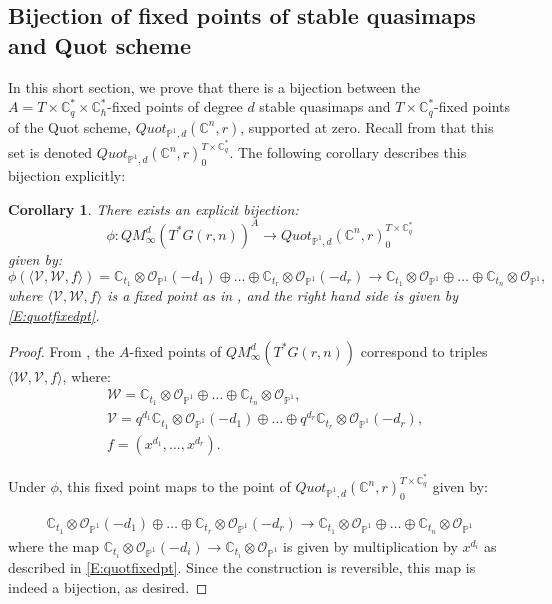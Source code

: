 \documentclass{amsart}
\newtheorem{Corollary}[thm]{Corollary}
\begin{document}
\subsection{Bijection of fixed points of stable quasimaps and Quot scheme}
In this short section, we prove that there is a bijection between the $A=T \times \mathbb{C}^*_q \times \mathbb{C}^*_\hbar$-fixed points of degree $d$ stable quasimaps and $T \times \mathbb{C}_q^*$-fixed points of the Quot scheme, $Quot_{\mathbb{P}^1,d}(\mathbb{C}^n,r)$, supported at zero. Recall from  that this set is denoted $Quot_{\mathbb{P}^1,d}(\mathbb{C}^n,r)_{0}^{T \times \mathbb{C}_q^*}$. The following corollary describes this bijection explicitly:
\begin{Corollary}
    There exists an explicit bijection: 
\[\phi: QM_{\infty}^d(T^*G(r,n))^{A} \to Quot_{\mathbb{P}^1,d}(\mathbb{C}^n,r)_0^{T \times \mathbb{C}_q^*}
\]
given by:
\[
\phi(\langle \mathcal{V},\mathcal{W},f\rangle) = \mathbb{C}_{t_1}\otimes\mathcal{O}_{\mathbb{P}^1}(-d_1) \oplus \dots \oplus \mathbb{C}_{t_r}\otimes\mathcal{O}_{\mathbb{P}^1}(-d_r) \to \mathbb{C}_{t_1}\otimes\mathcal{O}_{\mathbb{P}^1} \oplus \dots \oplus \mathbb{C}_{t_n}\otimes\mathcal{O}_{\mathbb{P}^1},
\]
where $\langle \mathcal{V},\mathcal{W},f\rangle$ is a fixed point as in , and the right hand side is given by \eqref{E:quotfixedpt}.

\end{Corollary}
\begin{proof}
From , the $A$-fixed points of $QM_{\infty}^d(T^*G(r,n))$ correspond to triples $\langle\mathcal{W},\mathcal{V},f\rangle$, where:
    \begin{align*}
    &\mathcal{W} = \mathbb{C}_{t_1}\otimes\mathcal{O}_{\mathbb{P}^1} \oplus\dots\oplus \mathbb{C}_{t_n}\otimes\mathcal{O}_{\mathbb{P}^1},\\&
    \mathcal{V} = q^{d_1}\mathbb{C}_{t_1}\otimes\mathcal{O}_{\mathbb{P}^1}(-d_1) \oplus \dots \oplus q^{d_r}\mathbb{C}_{t_r}\otimes\mathcal{O}_{\mathbb{P}^1}(-d_r),\\&
    f = (x^{d_1},\dots,x^{d_r}).
\end{align*}

Under $\phi$, this fixed point maps to the point of $Quot_{\mathbb{P}^1,d}(\mathbb{C}^n,r)_{0}^{T \times \mathbb{C}_q^*}$ given by: 
    
    \begin{align*}
        \mathbb{C}_{t_1}\otimes\mathcal{O}_{\mathbb{P}^1}(-d_1) \oplus \dots \oplus \mathbb{C}_{t_r}\otimes\mathcal{O}_{\mathbb{P}^1}(-d_r) \to \mathbb{C}_{t_1}\otimes\mathcal{O}_{\mathbb{P}^1} \oplus \dots \oplus \mathbb{C}_{t_n}\otimes\mathcal{O}_{\mathbb{P}^1}
    \end{align*}
where the map $\mathbb{C}_{t_i}\otimes\mathcal{O}_{\mathbb{P}^1}(-d_i) \to \mathbb{C}_{t_i}\otimes\mathcal{O}_{\mathbb{P}^1}$ is given by multiplication by $x^{d_i}$ as described in \eqref{E:quotfixedpt}.
Since the construction is reversible, this map is indeed a bijection, as desired.
 
\end{proof}
    
\end{document}
